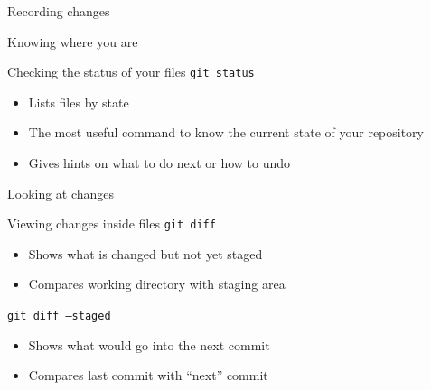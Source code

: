 \documentclass{beamer}
\begin{document}
\begin{frame}{Recording changes}
\end{frame}

\begin{frame}{Knowing where you are}
  \begin{block}{Checking the status of your files}
    \texttt{git status}
    \begin{itemize}
    \item Lists files by state
    \item The most useful command to know the current state of your repository
    \item Gives hints on what to do next or how to undo
    \end{itemize}
  \end{block}
\end{frame}

\begin{frame}{Looking at changes}
  \begin{block}{Viewing changes inside files}
    \texttt{git diff}
    \begin{itemize}
    \item Shows what is changed but not yet staged
    \item Compares working directory with staging area
    \end{itemize}
    \texttt{git diff --staged}
    \begin{itemize}
    \item Shows what would go into the next commit
    \item Compares last commit with ``next'' commit
    \end{itemize}
  \end{block}
\end{frame}
\end{document}
